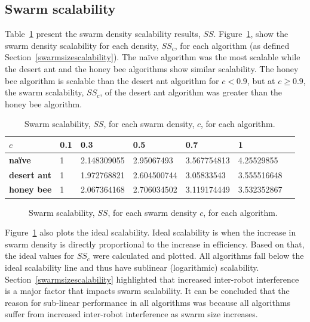 \subsection{Swarm scalability}
\label{results:swarmscalability}
Table~\ref{table:swarmscalability} present the swarm density scalability results, $SS$. Figure~\ref{fig:swarmscalability}, show the swarm density scalability for each density, $SS_c$, for each algorithm (as defined Section~\ref{swarmsizescalability}). The na\"ive algorithm was the most scalable while the desert ant and the honey bee algorithms show similar scalability. The honey bee algorithm is scalable than the desert ant algorithm for $c < 0.9$, but at $c \geq 0.9$, the swarm scalability, $SS_c$, of the desert ant algorithm was greater than the honey bee algorithm.

\begin{table}[]
\centering
\caption{Swarm scalability, $SS$, for each swarm density, $c$, for each algorithm.}
\label{table:swarmscalability}
\begin{tabular}{@{}lllllll@{}}
\toprule
\textbf{$c$}            & \textbf{0.1} & \textbf{0.3}         & \textbf{0.5}         & \textbf{0.7}         & \textbf{1}           \\ \midrule
\textbf{na\"ive}    & 1   & 2.148309055 & 2.95067493  & 3.567754813 & 4.25529855  \\
\textbf{desert ant} & 1   & 1.972768821 & 2.604500744 & 3.05833543  & 3.555516648 \\
\textbf{honey bee}  & 1   & 2.067364168 & 2.706034502 & 3.119174449 & 3.532352867 \\ \bottomrule
\end{tabular}
\end{table}

\begin{figure}[!htb]
\centering
\small
\resizebox{\textwidth}{!}{}
\caption{Swarm scalability, $SS$, for each swarm density $c$, for each algorithm.}
\label{fig:swarmscalability}
\end{figure}

Figure~\ref{fig:swarmscalability} also plots the ideal scalability. Ideal scalability is when the increase in swarm density is directly proportional to the increase in efficiency. Based on that, the ideal values for $SS_c$ were calculated and plotted. All algorithms fall below the ideal scalability line and thus have sublinear (logarithmic) scalability. Section~\ref{swarmsizescalability} highlighted that increased inter-robot interference is a major factor that impacts swarm scalability. It can be concluded that the reason for sub-linear performance in all algorithms was because all algorithms suffer from increased inter-robot interference as swarm size increases.

